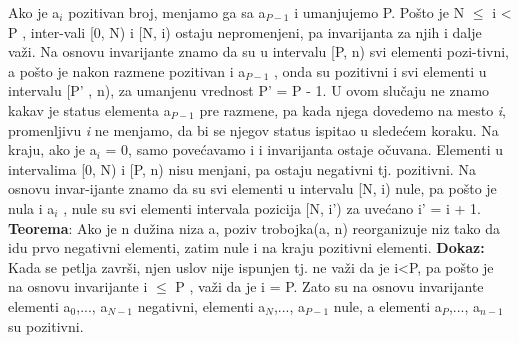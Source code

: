\documentclass{article}
\begin{document}
Ako je a$_i$ pozitivan \hspace*{0.8cm}broj, menjamo ga sa a$_{P-1}$ i umanjujemo P. Pošto je N $\leq$ i < P , inter-\hspace*{0.8cm}vali [0, N) i [N, i) ostaju nepromenjeni, pa invarijanta za njih i dalje važi. \hspace*{0.8cm}Na osnovu invarijante znamo da su u intervalu [P, n) svi elementi pozi-\hspace*{0.8cm}tivni, a pošto je nakon razmene pozitivan i a$_{P-1}$ , onda su pozitivni i \hspace*{0.8cm}svi elementi u intervalu [P' , n), za umanjenu vrednost P' = P - 1. U \hspace*{0.8cm}ovom slučaju ne  znamo kakav je status elementa a$_{P-1}$ pre razmene, pa \hspace*{0.8cm}kada njega dovedemo na mesto \textit{i}, promenljivu \textit{i} ne menjamo, da bi se \hspace*{0.8cm}njegov status ispitao u 	    sledećem koraku. Na kraju, ako je a$_{i}$ = 0, samo \hspace*{0.8cm}povećavamo i i invarijanta ostaje očuvana. Elementi u 	   	     intervalima [0, N) \hspace*{0.8cm}i [P, n) nisu menjani, pa ostaju negativni tj. pozitivni. Na osnovu invar-\hspace*{0.8cm}ijante znamo da su svi elementi u intervalu [N, i) nule, pa pošto je nula \hspace*{0.8cm}i a$_{i}$ , nule su 	     svi elementi intervala pozicija [N, i') za uvećano i' = i + 1.
\vspace{0.2cm}	\newline \textbf{Teorema}: Ako je n dužina niza a, poziv trobojka(a, n) reorganizuje niz tako da idu prvo negativni elementi, zatim nule i na kraju pozitivni elementi.
\newline \hspace*{0.4cm}\textbf{Dokaz:}
\newline \hspace*{0.8cm}Kada se petlja završi, njen uslov nije ispunjen tj. ne važi da je i<P, pa \hspace*{0.8cm}pošto je na osnovu 	invarijante i $\leq$ P , važi da je i = P. Zato su na osnovu \hspace*{0.8cm}invarijante elementi a$_0$,..., a$_{N-1}$ negativni, 	elementi a$_N$,..., a$_{P-1}$ nule, a \hspace*{0.8cm}elementi a$_P$,..., a$_{n-1}$ su pozitivni.
\end{document}
